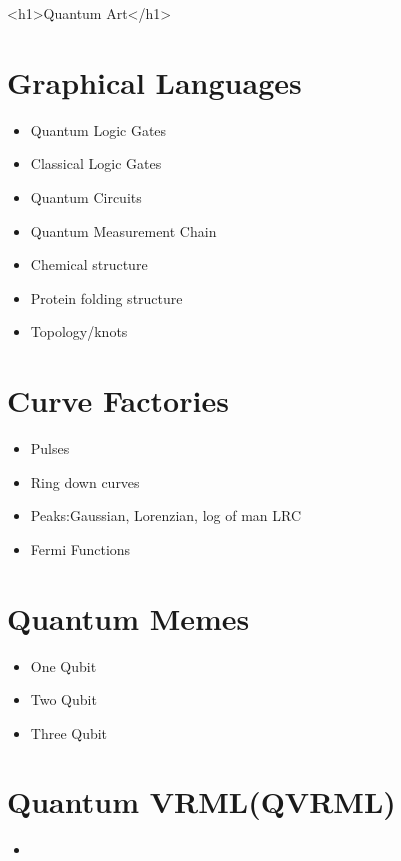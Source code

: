 \documentclass[11pt]{article}
\begin{document}
<h1>Quantum Art</h1>

\section{
Graphical Languages}
\begin{itemize}

    \item
Quantum Logic Gates
    \item
Classical Logic Gates
    \item
Quantum Circuits
    \item
Quantum Measurement Chain
    \item
Chemical structure
    \item
Protein folding structure
    \item
Topology/knots
\end{itemize}

\section{
Curve Factories}
\begin{itemize}

    \item
Pulses
    \item
Ring down curves
    \item
Peaks:Gaussian, Lorenzian, log of man LRC
    \item
Fermi Functions
\end{itemize}

\section{
Quantum Memes}
\begin{itemize}

    \item
One Qubit
    \item
Two Qubit
    \item
Three Qubit
\end{itemize}

\section{
Quantum VRML(QVRML)}
\begin{itemize}

    \item

\end{itemize}
\end{document}
